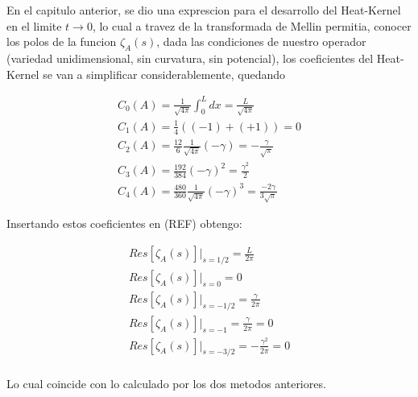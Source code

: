 En el capitulo anterior, se dio una exprescion para el desarrollo del Heat-Kernel en el limite $t \rightarrow 0$, lo cual a travez de la transformada de Mellin permitia, conocer los polos de la funcion $\zeta _A (s)$, dada las condiciones de nuestro operador (variedad unidimensional, sin curvatura, sin potencial), los coeficientes del Heat-Kernel se van a simplificar considerablemente, quedando

\begin{equation}
\begin{array}{c}
C _0 (A) = \frac{1}{\sqrt{4 \pi}} \int _{0} ^{L} dx = \frac{L}{\sqrt{4 \pi}} \\
C _1 (A) = \frac{1}{4} \left( (-1) + (+1) \right) = 0 \\
C _2 (A) = \frac{12}{6} \frac{1}{\sqrt{4 \pi }} \left(  - \gamma \right) = - \frac{\gamma}{\sqrt{\pi}} \\
C _3 (A) = \frac{192}{384}  (- \gamma ) ^2 = \frac{\gamma ^2}{2} \\
C _4 (A) = \frac{480}{360} \frac{1}{\sqrt{4 \pi}} (- \gamma) ^3 = \frac{-2 \gamma}{3 \sqrt{\pi}}

\end{array}
\end{equation}

Insertando estos coeficientes en (REF) obtengo:

\begin{equation}
\begin{array}{c}
Res[ \zeta _A (s)] | _{s=1/2} = \frac{L}{2 \pi} \\
Res[ \zeta _A (s)] | _{s=0} = 0 \\
Res[ \zeta _A (s)] | _{s=-1/2} = \frac{\gamma}{2 \pi} \\
Res[ \zeta _A (s)] | _{s=-1} = \frac{\gamma}{2 \pi} = 0 \\
Res[ \zeta _A (s)] | _{s=-3/2} = - \frac{\gamma ^2}{2 \pi} = 0 \\


\end{array}
\end{equation}

Lo cual coincide con lo calculado por los dos metodos anteriores.
